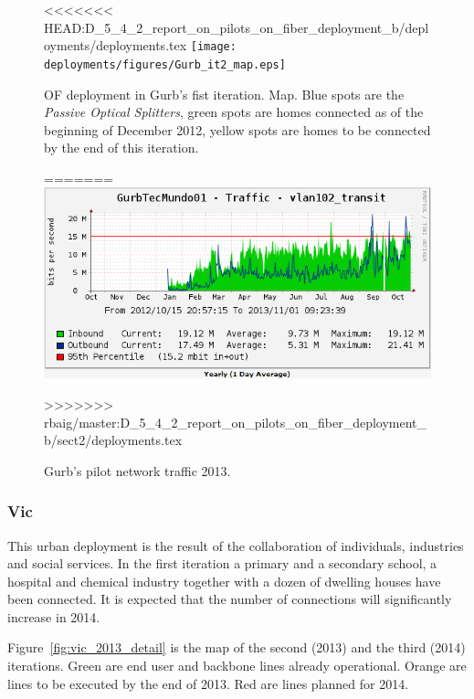 \begin{figure}[H]
  \centering
<<<<<<< HEAD:D_5_4_2_report_on_pilots_on_fiber_deployment_b/deployments/deployments.tex
  \texttt{[image: deployments/figures/Gurb\_it2\_map.eps]} 
  \caption{OF deployment in Gurb's fist iteration. Map. Blue spots are the \emph{Passive Optical Splitters}, green spots are homes connected as of the beginning of December 2012, yellow spots are homes to be connected by the end of this iteration.}
  \label{fig:gurb_it2_map}
=======
  \includegraphics[width=0.95\linewidth]{sect2/figures/gurb_2013_transit.png}
  \caption[Gurb pilot: Network traffic 2013]{Gurb's pilot network traffic 2013.}
  \label{fig:gurb_2013_transit}
>>>>>>> rbaig/master:D_5_4_2_report_on_pilots_on_fiber_deployment_b/sect2/deployments.tex
\end{figure}


\FloatBarrier
\subsubsection{Vic}
\label{dep_vic}

This urban deployment is the result of the collaboration of individuals, industries and social services. In the first iteration a primary and a secondary school, a hospital and chemical industry together with a dozen of dwelling houses have been connected. It is expected that the number of connections will significantly increase in 2014.

Figure~\ref{fig:vic_2013_detail} is the map of the second (2013) and the third (2014) iterations. Green are end user and backbone lines already operational. Orange are lines to be executed by the end of 2013. Red are lines planned for 2014.


